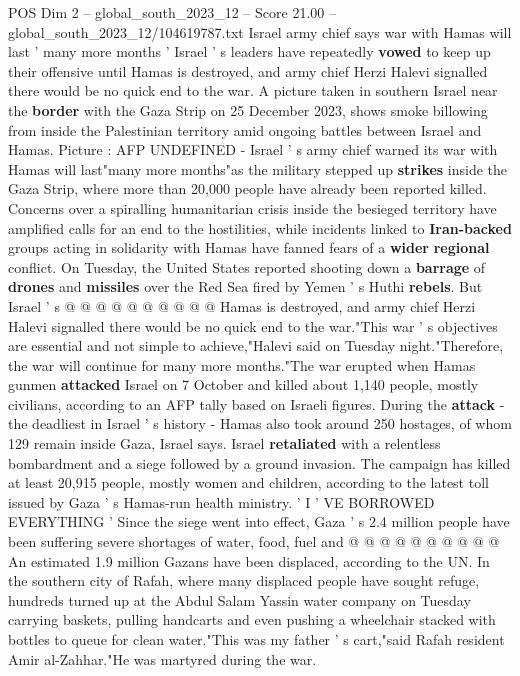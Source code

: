 \begin{textsample}{POS Dim 2 – global\_south\_2023\_12 – Score 21.00 – global\_south\_2023\_12/104619787.txt}  \label{ex:f2_pos_157}
Israel army chief says war with Hamas will last ' many more months ' Israel ' s leaders have repeatedly \textbf{vowed} to keep up their offensive until Hamas is destroyed, and army chief Herzi Halevi signalled there would be no quick end to the war.
A picture taken in southern Israel near the \textbf{border} with the Gaza Strip on 25 December 2023, shows smoke billowing from inside the Palestinian territory amid ongoing battles between Israel and Hamas.
Picture : AFP UNDEFINED - Israel ' s army chief warned its war with Hamas will last"many more months"as the military stepped up \textbf{strikes} inside the Gaza Strip, where more than 20,000 people have already been reported killed.
Concerns over a spiralling humanitarian crisis inside the besieged territory have amplified calls for an end to the hostilities, while incidents linked to \textbf{Iran-backed} groups acting in solidarity with Hamas have fanned fears of a \textbf{wider} \textbf{regional} conflict.
On Tuesday, the United States reported shooting down a \textbf{barrage} of \textbf{drones} and \textbf{missiles} over the Red Sea fired by Yemen ' s Huthi \textbf{rebels}.
But Israel ' s @ @ @ @ @ @ @ @ @ @ Hamas is destroyed, and army chief Herzi Halevi signalled there would be no quick end to the war."This war ' s objectives are essential and not simple to achieve,"Halevi said on Tuesday night."Therefore, the war will continue for many more months."The war erupted when Hamas gunmen \textbf{attacked} Israel on 7 October and killed about 1,140 people, mostly civilians, according to an AFP tally based on Israeli figures.
During the \textbf{attack} - the deadliest in Israel ' s history - Hamas also took around 250 hostages, of whom 129 remain inside Gaza, Israel says.
Israel \textbf{retaliated} with a relentless bombardment and a siege followed by a ground invasion.
The campaign has killed at least 20,915 people, mostly women and children, according to the latest toll issued by Gaza ' s Hamas-run health ministry. ' I ' VE BORROWED EVERYTHING ' Since the siege went into effect, Gaza ' s 2.4 million people have been suffering severe shortages of water, food, fuel and @ @ @ @ @ @ @ @ @ @ An estimated 1.9 million Gazans have been displaced, according to the UN.
In the southern city of Rafah, where many displaced people have sought refuge, hundreds turned up at the Abdul Salam Yassin water company on Tuesday carrying baskets, pulling handcarts and even pushing a wheelchair stacked with bottles to queue for clean water."This was my father ' s cart,"said Rafah resident Amir al-Zahhar."He was martyred during the war.

\end{textsample}
